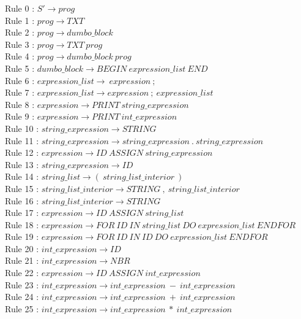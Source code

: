 \documentclass[10pt,a4paper]{article}
\begin{document}
\begin{flushleft}
Rule 0 : $S' \rightarrow prog$\\
Rule 1 : $prog \rightarrow TXT$\\
Rule 2 : $prog \rightarrow dumbo\_block$\\
Rule 3 : $prog \rightarrow TXT\ prog$\\
Rule 4 : $prog \rightarrow dumbo\_block\ prog$\\
Rule 5 : $dumbo\_block \rightarrow BEGIN\ expression\_list\ END$\\
Rule 6 : $expression\_list \rightarrow\ expression\ ;$\\
Rule 7 : $expression\_list \rightarrow expression\ ;\ expression\_list$\\
Rule 8 : $expression \rightarrow PRINT\ string\_expression$\\
Rule 9 : $expression \rightarrow PRINT\ int\_expression$\\
Rule 10 : $string\_expression \rightarrow STRING$\\
Rule 11 : $string\_expression \rightarrow string\_expression\ .\ string\_expression$\\
Rule 12 : $expression \rightarrow ID\ ASSIGN\ string\_expression$\\
Rule 13 : $string\_expression \rightarrow ID$\\
Rule 14 : $string\_list \rightarrow (\ string\_list\_interior\ )$\\
Rule 15 : $string\_list\_interior \rightarrow STRING\ ,\ string\_list\_interior$\\
Rule 16 : $string\_list\_interior \rightarrow STRING$\\
Rule 17 : $expression \rightarrow ID\ ASSIGN\ string\_list$\\
Rule 18 : $expression \rightarrow FOR\ ID\ IN\ string\_list\ DO\ expression\_list\ ENDFOR$\\
Rule 19 : $expression \rightarrow FOR\ ID\ IN\ ID\ DO\ expression\_list\ ENDFOR$\\
Rule 20 : $int\_expression \rightarrow ID$\\
Rule 21 : $int\_expression \rightarrow NBR$\\
Rule 22 : $expression \rightarrow ID\ ASSIGN\ int\_expression$\\
Rule 23 : $int\_expression \rightarrow int\_expression\ -\ int\_expression$\\
Rule 24 : $int\_expression \rightarrow int\_expression\ +\ int\_expression$\\
Rule 25 : $int\_expression \rightarrow int\_expression\ *\ int\_expression$\\

\end{flushleft}
\end{document}
